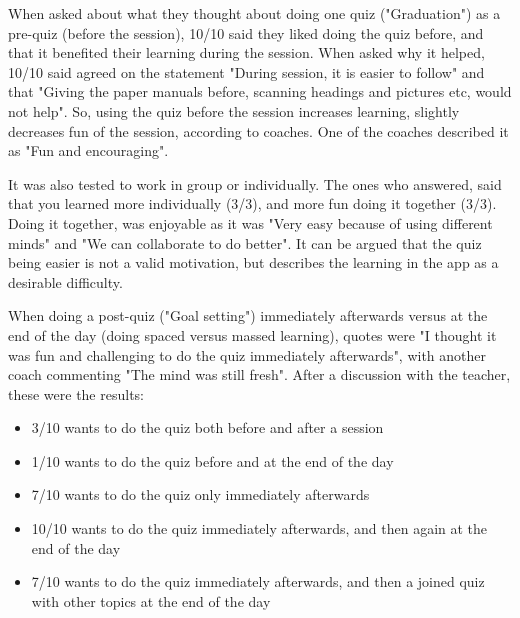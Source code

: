 When asked about what they thought about doing one quiz ("Graduation") as a pre-quiz (before the session), 10/10 said they liked doing the quiz before, and that it benefited their learning during the session. When asked why it helped, 10/10 said agreed on the statement "During session, it is easier to follow" and that "Giving the paper manuals before, scanning headings and pictures etc, would not help". So, using the quiz before the session increases learning, slightly decreases fun of the session, according to coaches. One of the coaches described it as "Fun and encouraging".

    It was also tested to work in group or individually. The ones who answered, said that you learned more individually (3/3), and more fun doing it together (3/3). Doing it together, was enjoyable as it was "Very easy because of using different minds" and "We can collaborate to do better". It can be argued that the quiz being easier is not a valid motivation, but describes the learning in the app as a desirable difficulty.

    When doing a post-quiz ("Goal setting") immediately afterwards versus at the end of the day (doing spaced versus massed learning), quotes were "I thought it was fun and challenging to do the quiz immediately afterwards", with another coach commenting "The mind was still fresh". After a discussion with the teacher, these were the results:




    \begin{itemize}
    \item 3/10 wants to do the quiz both before and after a session
    \item 1/10 wants to do the quiz before and at the end of the day
    \item 7/10 wants to do the quiz only immediately afterwards
    \item 10/10 wants to do the quiz immediately afterwards, and then again at the end of the day
    \item 7/10 wants to do the quiz immediately afterwards, and then a joined quiz with other topics at the end of the day
    \end{itemize}

